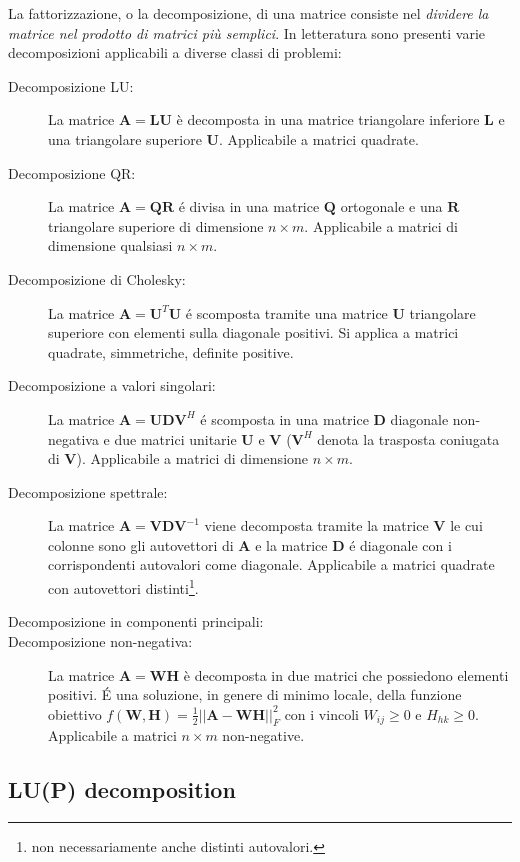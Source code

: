 \documentclass[10pt]{article}
\begin{document}
La fattorizzazione, o la decomposizione, di una matrice consiste nel \emph{dividere la matrice nel prodotto di matrici più semplici}.
In letteratura sono presenti varie decomposizioni applicabili a diverse classi di problemi:
\begin{description}
\item[Decomposizione LU:] La matrice $\mathbf{A}=\mathbf{L}\mathbf{U}$ è decomposta in una matrice triangolare inferiore $\mathbf{L}$ e una triangolare superiore $\mathbf{U}$. Applicabile a matrici quadrate.
\item[Decomposizione QR:] La matrice $\mathbf{A}=\mathbf{Q}\mathbf{R}$ é divisa in una matrice $\mathbf{Q}$ ortogonale e una $\mathbf{R}$ triangolare superiore di dimensione $n\times m$. Applicabile a matrici di dimensione qualsiasi $n\times m$.
\item[Decomposizione di Cholesky:] La matrice $\mathbf{A}=\mathbf{U}^T\mathbf{U}$ é scomposta tramite una matrice $\mathbf{U}$ triangolare superiore con elementi sulla diagonale positivi. Si applica a matrici quadrate, simmetriche, definite positive.
\item[Decomposizione a valori singolari:] La matrice $\mathbf{A}=\mathbf{U}\mathbf{D}\mathbf{V}^H$ é scomposta in una matrice $\mathbf{D}$ diagonale non-negativa e due matrici unitarie $\mathbf{U}$ e $\mathbf{V}$ ($\mathbf{V}^H$ denota la trasposta coniugata di $\mathbf{V}$). Applicabile a matrici di dimensione $n\times m$.
\item[Decomposizione spettrale:] La matrice $\mathbf{A}=\mathbf{V}\mathbf{D}\mathbf{V}^{-1}$ viene decomposta tramite la matrice $\mathbf{V}$ le cui colonne sono gli autovettori di $\mathbf{A}$ e la matrice $\mathbf{D}$ é diagonale con i corrispondenti autovalori come diagonale. Applicabile a matrici quadrate con autovettori distinti\footnote{non necessariamente anche distinti autovalori.}.
\item[Decomposizione in componenti principali:]
\item[Decomposizione non-negativa:] La matrice $\mathbf{A}=\mathbf{W}\mathbf{H}$ è decomposta in due matrici che possiedono elementi positivi. É una soluzione, in genere di minimo locale, della funzione obiettivo $f(\mathbf{W},\mathbf{H})=\frac{1}{2}||\mathbf{A}-\mathbf{W}\mathbf{H}||^2_F$ con i vincoli $W_{ij} \geq 0$ e $H_{hk}\geq 0$. Applicabile a matrici $n\times m$ non-negative.
\end{description}

\subsection{LU(P) decomposition}
\end{document}
